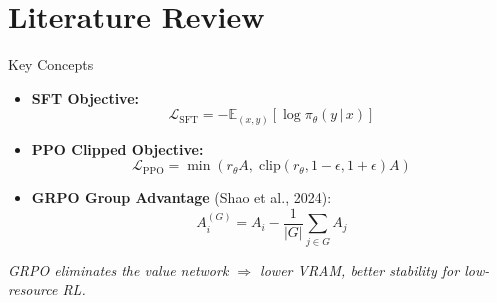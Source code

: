 \documentclass[10pt]{beamer}
\begin{document}
\section{Literature Review}

\begin{frame}{Key Concepts}
\large
\begin{itemize}
    \item \textbf{SFT Objective:}
    \[
        \mathcal{L}_{\text{SFT}} = - \mathbb{E}_{(x,y)}[\log \pi_\theta(y\,|\,x)]
    \]

    \item \textbf{PPO Clipped Objective:}
    \[
        \mathcal{L}_{\text{PPO}} = 
        \min\!\left(
            r_\theta A,\;
            \text{clip}(r_\theta, 1-\epsilon, 1+\epsilon) A
        \right)
    \]

    \item \textbf{GRPO Group Advantage} (Shao et al., 2024):
    \[
        A_i^{(G)} = A_i - \frac{1}{|G|} \sum_{j \in G} A_j
    \]
\end{itemize}

\vspace{0.3cm}
{\small \textit{GRPO eliminates the value network $\Rightarrow$ lower VRAM, better stability for low-resource RL.}}
\end{frame}
\end{document}
